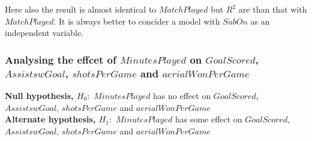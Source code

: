 \documentclass[12pt]{article}
\begin{document}
Here also the result is almost identical to $ MatchPlayed $ but $ R^2 $ are than that with $ MatchPlayed $. It is always better to concider a model with $ SubOn $ as an independent variable. 

\newpage

\subsubsection{Analysing the effcet of $ MinutesPlayed $ on $ GoalScored $, \\ $ AssistswGoal $, $ shotsPerGame $ and $ aerialWonPerGame $}

\textbf{Null hypothesis, $ H_0: $} $ MinutesPlayed $ has no effect on $ GoalScored $, $ AssistswGoal $, $ shotsPerGame $ and $ aerialWonPerGame $\\
\textbf{Alternate hypothesis, $ H_1: $} $ MinutesPlayed $ has some effect on $ GoalScored $, $ AssistswGoal $, $ shotsPerGame $ and $ aerialWonPerGame $
\end{document}
